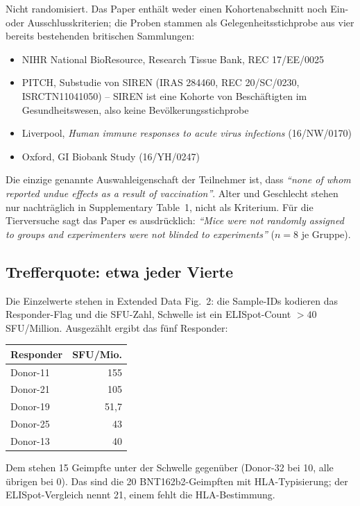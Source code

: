 \documentclass[11pt,a4paper]{article}
\begin{document}
Nicht randomisiert. Das Paper enthält weder einen Kohortenabschnitt noch
Ein- oder Ausschlusskriterien; die Proben stammen als Gelegenheitsstichprobe
aus vier bereits bestehenden britischen Sammlungen:

\begin{itemize}
\item NIHR National BioResource, Research Tissue Bank, REC 17/EE/0025
\item PITCH, Substudie von SIREN (IRAS 284460, REC 20/SC/0230,
      ISRCTN11041050) -- SIREN ist eine Kohorte von Beschäftigten im
      Gesundheitswesen, also keine Bevölkerungsstichprobe
\item Liverpool, \emph{Human immune responses to acute virus infections}
      (16/NW/0170)
\item Oxford, GI Biobank Study (16/YH/0247)
\end{itemize}

Die einzige genannte Auswahleigenschaft der Teilnehmer ist, dass
\emph{``none of whom reported undue effects as a result of vaccination''}.
Alter und Geschlecht stehen nur nachträglich in Supplementary Table~1, nicht
als Kriterium. Für die Tierversuche sagt das Paper es ausdrücklich:
\emph{``Mice were not randomly assigned to groups and experimenters were not
blinded to experiments''} ($n = 8$ je Gruppe).

\subsection{Trefferquote: etwa jeder Vierte}

Die Einzelwerte stehen in Extended Data Fig.~2: die Sample-IDs kodieren das
Responder-Flag und die SFU-Zahl, Schwelle ist ein ELISpot-Count
$> 40$\,SFU/Million. Ausgezählt ergibt das fünf Responder:

\begin{center}
\begin{tabular}{lr}
\toprule
Responder & SFU/Mio. \\
\midrule
Donor-11 & 155 \\
Donor-21 & 105 \\
Donor-19 & 51{,}7 \\
Donor-25 & 43 \\
Donor-13 & 40 \\
\bottomrule
\end{tabular}
\end{center}

Dem stehen 15 Geimpfte unter der Schwelle gegenüber (Donor-32 bei 10, alle
übrigen bei 0). Das sind die 20 BNT162b2-Geimpften mit HLA-Typisierung; der
ELISpot-Vergleich nennt 21, einem fehlt die HLA-Bestimmung.
\end{document}
